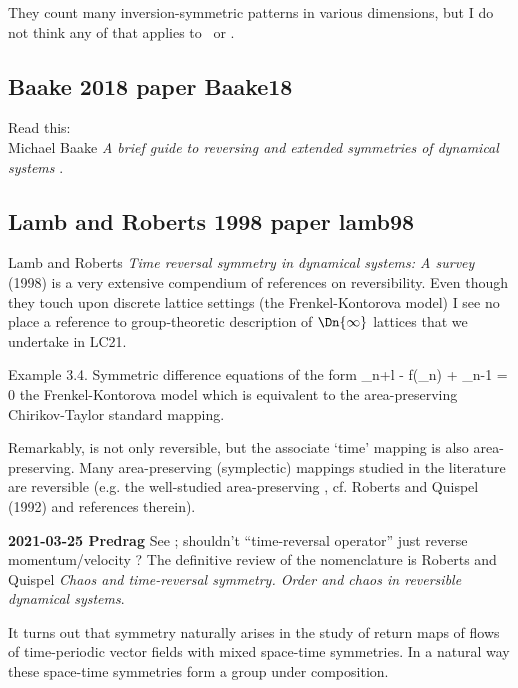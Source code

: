 {They count many inversion-symmetric patterns in various dimensions, but
I do not think any of that applies to \templatt\ or \catlatt.

\subsection{Baake 2018 paper {Baake18}}
\label{sect:Baake18}

Read this:\\
Michael Baake
{\em A brief guide to reversing and extended symmetries of dynamical systems}
.


\subsection{Lamb and Roberts 1998 paper {lamb98}}
\label{sect:lamb98}

Lamb and Roberts
{\em Time reversal symmetry in dynamical systems: {A} survey}
(1998)
is a very extensive compendium of references on reversibility.
Even though they touch upon discrete lattice settings
(the Frenkel-Kontorova
model) I see no place a reference to group-theoretic description of
$\Dn{\infty}$ lattices that we undertake in LC21.


Example 3.4.                          
Symmetric difference equations of the form
\beq
\ssp_{n+l} - f(\ssp_n) + \ssp_{n-1} = 0
the Frenkel-Kontorova
model which is equivalent to the area-preserving
Chirikov-Taylor standard mapping.

Remarkably,  is not only reversible, but
the associate `time' mapping is also
area-preserving. Many area-preserving (symplectic)
mappings studied in the literature are reversible
(e.g. the well-studied area-preserving \HenonMap,
cf. Roberts and Quispel (1992) and references
therein).

    {\bf 2021-03-25 Predrag}{
See ; shouldn't ``time-reversal operator'' just
reverse momentum/velocity ? The definitive review of
the nomenclature is Roberts and Quispel {\em Chaos and
time-reversal symmetry. {Order} and chaos in reversible dynamical
systems}.
    }

It turns out that symmetry naturally arises in the
study of return maps of flows of time-periodic vector
fields with mixed space-time symmetries. In a natural
way these space-time symmetries form a group
under composition.

}
